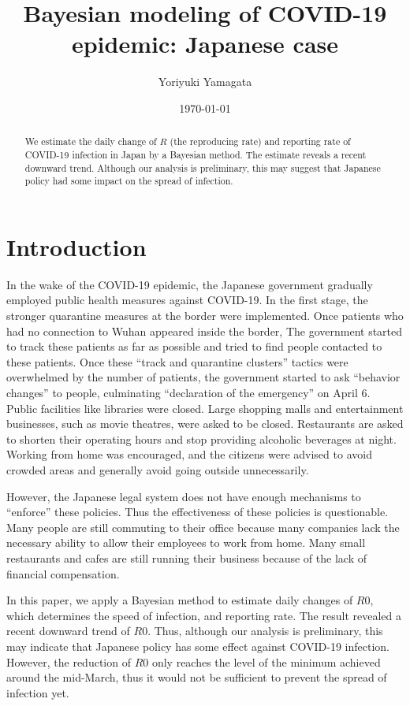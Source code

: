 \documentclass{amsart}
\title{Bayesian modeling of COVID-19 epidemic: Japanese case}
\author{Yoriyuki Yamagata}
\date{\today}
\begin{document}
\maketitle

\begin{abstract}
 We estimate the daily change of $R$ (the reproducing rate) and reporting rate of COVID-19 infection in Japan by a Bayesian method.
 The estimate reveals a recent downward trend.
 Although our analysis is preliminary, this may suggest that Japanese policy had some impact on the spread of infection.
\end{abstract}

\section{Introduction}

In the wake of the COVID-19 epidemic, the Japanese government gradually employed public health measures against COVID-19.
In the first stage, the stronger quarantine measures at the border were implemented.
Once patients who had no connection to Wuhan appeared inside the border, The government started to track these patients as far as possible and tried to find people contacted to these patients.
Once these ``track and quarantine clusters'' tactics were overwhelmed by the number of patients, the government started to ask ``behavior changes'' to people, culminating ``declaration of the emergency'' on April 6.
Public facilities like libraries were closed.
Large shopping malls and entertainment businesses, such as movie theatres, were asked to be closed.
Restaurants are asked to shorten their operating hours and stop providing alcoholic beverages at night.
Working from home was encouraged, and the citizens were advised to avoid crowded areas and generally avoid going outside unnecessarily.

However, the Japanese legal system does not have enough mechanisms to ``enforce'' these policies.
Thus the effectiveness of these policies is questionable.
Many people are still commuting to their office because many companies lack the necessary ability to allow their employees to work from home.
Many small restaurants and cafes are still running their business because of the lack of financial compensation.

In this paper, we apply a Bayesian method to estimate daily changes of $R0$, which determines the speed of infection, and reporting rate.
The result revealed a recent downward trend of $R0$.
Thus, although our analysis is preliminary, this may indicate that Japanese policy has some effect against COVID-19 infection.
However, the reduction of $R0$ only reaches the level of the minimum achieved around the mid-March, thus it would not be sufficient to prevent the spread of infection yet.
\end{document}
